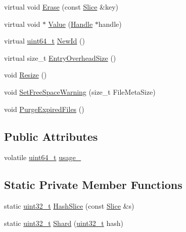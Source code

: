 \begin{DoxyCompactItemize}
\item 
virtual void \hyperlink{classleveldb_1_1_sharded_l_r_u_cache2_a296f73883592ca73156c67356051e8b7}{Erase} (const \hyperlink{classleveldb_1_1_slice}{Slice} \&key)
\item 
virtual void $\ast$ \hyperlink{classleveldb_1_1_sharded_l_r_u_cache2_a911338e85f8988883b22ffd7adcc0cdf}{Value} (\hyperlink{structleveldb_1_1_cache_1_1_handle}{Handle} $\ast$handle)
\item 
virtual \hyperlink{stdint_8h_aaa5d1cd013383c889537491c3cfd9aad}{uint64\+\_\+t} \hyperlink{classleveldb_1_1_sharded_l_r_u_cache2_af0a4d0043984b459037b63a95f6a95ac}{New\+Id} ()
\item 
virtual size\+\_\+t \hyperlink{classleveldb_1_1_sharded_l_r_u_cache2_a56dd32c4edfa6e27859eb1d7c256f296}{Entry\+Overhead\+Size} ()
\item 
void \hyperlink{classleveldb_1_1_sharded_l_r_u_cache2_a11bb95b7b34980262cb8956e7d360c0d}{Resize} ()
\item 
void \hyperlink{classleveldb_1_1_sharded_l_r_u_cache2_a9d9b475614c017e719cded9479340a80}{Set\+Free\+Space\+Warning} (size\+\_\+t File\+Meta\+Size)
\item 
void \hyperlink{classleveldb_1_1_sharded_l_r_u_cache2_aa9abb8ef9e3ee75e2ab18714713ca974}{Purge\+Expired\+Files} ()
\end{DoxyCompactItemize}
\subsection*{Public Attributes}
\begin{DoxyCompactItemize}
\item 
volatile \hyperlink{stdint_8h_aaa5d1cd013383c889537491c3cfd9aad}{uint64\+\_\+t} \hyperlink{classleveldb_1_1_sharded_l_r_u_cache2_a4a5ba487471eb7b7bfbd875281dfe4fe}{usage\+\_\+}
\end{DoxyCompactItemize}
\subsection*{Static Private Member Functions}
\begin{DoxyCompactItemize}
\item 
static \hyperlink{stdint_8h_a435d1572bf3f880d55459d9805097f62}{uint32\+\_\+t} \hyperlink{classleveldb_1_1_sharded_l_r_u_cache2_aac3ba88e4695496f88e9310efea3eb96}{Hash\+Slice} (const \hyperlink{classleveldb_1_1_slice}{Slice} \&s)
\item 
static \hyperlink{stdint_8h_a435d1572bf3f880d55459d9805097f62}{uint32\+\_\+t} \hyperlink{classleveldb_1_1_sharded_l_r_u_cache2_a3d305c213012d5efe0cf0c95f5b73544}{Shard} (\hyperlink{stdint_8h_a435d1572bf3f880d55459d9805097f62}{uint32\+\_\+t} hash)
\end{DoxyCompactItemize}
